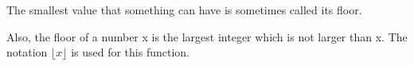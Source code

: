 The smallest value that something can have is sometimes called its floor.
\par
Also, the floor of a number x is the largest integer
which is not larger than x. The notation $ \lfloor x \rfloor $ is
used for this function.